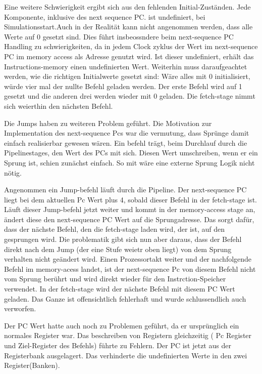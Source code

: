 \documentclass[paper=a4,fontsize=12pt,twocolumn]{scrreprt}
\begin{document}
Eine weitere Schwierigkeit ergibt sich aus den fehlenden Initial-Zuständen.
Jede Komponente, inklusive des next sequence PC. ist undefiniert, bei Simulationsstart.Auch in der Realität kann nicht angenommen werden, dass alle Werte auf 0 gesetzt sind. Dies führt insbeossndere beim next-sequence PC Handling zu schwierigkeiten, da in jedem Clock zyklus der Wert im next-sequence PC im memory access als Adresse genutzt wird. Ist dieser undefiniert, erhält das Instructions-memory einen undefinierten Wert. Weiterhin muss daraufgeachtet werden, wie die richtigen Initialwerte gesetzt sind: Wäre alles mit 0 initialisiert, würde vier mal der nullte Befehl geladen werden. Der erste Befehl wird auf 1 gesetzt und die anderen drei werden wieder mit 0 geladen. Die fetch-stage nimmt sich weierthin den nächsten Befehl.


Die Jumps haben zu weiteren Problem geführt.
Die Motivation zur Implementation des next-sequence Pcs war die vermutung, dass Sprünge damit einfach realisierbar gewesen wären. Ein befehl trägt, beim Durchlauf durch die Pipelinestages, den Wert des PCs mit sich. Diesen Wert umschreiben, wenn er ein Sprung ist, schien zunächst einfach. So mit wäre eine externe Sprung Logik nicht nötig. 

Angenommen ein Jump-befehl läuft durch die  Pipeline. Der next-sequence PC liegt bei dem aktuellen Pc Wert plus 4, sobald dieser Befehl in der fetch-stage ist. Läuft dieser Jump-befehl jetzt weiter und kommt in der memory-access stage an, ändert diese den next-sequence PC Wert auf die Sprungadresse. Das sorgt dafür, dass der nächste Befehl, den die fetch-stage laden wird, der ist, auf den gesprungen wird. Die problematik gibt sich nun aber daraus, dass der Befehl direkt nach dem Jump (der eine Stufe weietr oben liegt) von dem Sprung verhalten nicht geändert wird. Einen Prozessortakt weiter und der nachfolgende Befehl im memory-acess landet, ist der next-sequence Pc von diesem Befehl nicht vom Sprung berührt und wird direkt wieder für den Instrction-Speicher verwendet. In der fetch-stage wird der nächste Befehl mit diesem PC Wert geladen. 
Das Ganze ist offensichtlich fehlerhaft und wurde schlussendlich auch verworfen.

Der PC Wert hatte auch noch zu Problemen geführt, da er ursprünglich ein normales Register war. Das beschreiben von Registern gleichzeitig ( Pc Register und Ziel-Register des Befehls) führte zu Fehlern.
Der PC ist jetzt aus der Registerbank ausgelagert.
Das verhinderte die undefinierten Werte in den zwei Register(Banken).
\end{document}
